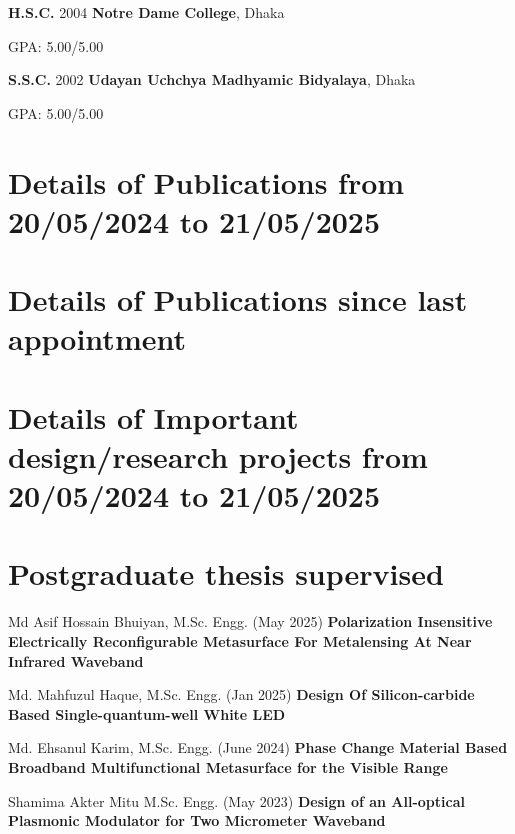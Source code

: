 \documentclass[cvauthor={Dr. Sajid Muhaimin Choudhury}]{buetcv}
\begin{document}
        \begin{threecolentry}{\textbf{H.S.C.}}{
            2004
        }
            \textbf{Notre Dame College}, Dhaka 
            \begin{highlights}
                \item GPA: 5.00/5.00 
            \end{highlights}
        \end{threecolentry}
        \begin{threecolentry}{\textbf{S.S.C.}}{
            2002
        }
            \textbf{Udayan Uchchya Madhyamic Bidyalaya}, Dhaka 
            \begin{highlights}
                \item GPA: 5.00/5.00 
            \end{highlights}
        \end{threecolentry}        

\section{Details of Publications from 20/05/2024 to 21/05/2025}

\section{Details of Publications since last appointment}


\section{Details of Important design/research projects from 20/05/2024 to 21/05/2025}


\section{Postgraduate thesis supervised}
\vspace{0.2 cm}
\begin{highlights}
\item Md Asif Hossain Bhuiyan, M.Sc. Engg. (May 2025) \textbf{Polarization Insensitive Electrically Reconfigurable Metasurface For Metalensing At Near Infrared Waveband}
\item Md. Mahfuzul Haque,  M.Sc. Engg. (Jan 2025) \textbf{Design Of Silicon-carbide Based Single-quantum-well White LED}
\item Md. Ehsanul Karim, M.Sc. Engg. (June 2024) \textbf{Phase Change Material Based Broadband Multifunctional Metasurface for the Visible Range}
\item Shamima Akter Mitu M.Sc. Engg. (May 2023) \textbf{Design of an All-optical Plasmonic Modulator for Two Micrometer Waveband}
\end{highlights}        
\end{document}
